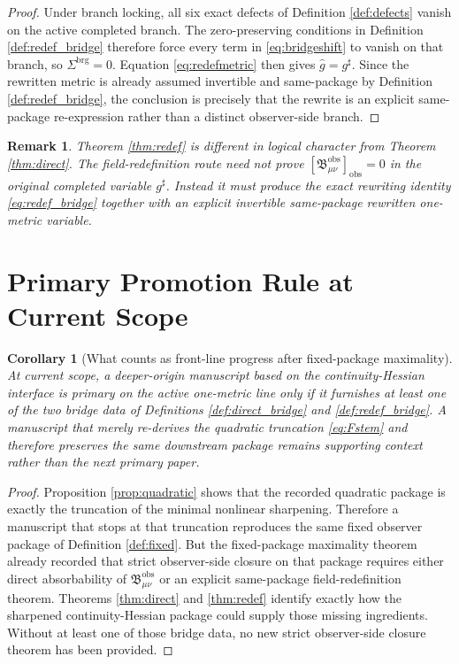 \documentclass[11pt]{article}
\newcommand{\CompletedMetric}{g^{\sharp}}
\newcommand{\RedefMetric}{\widehat g}
\newcommand{\BridgeShift}{\Sigma^{\mathrm{brg}}}
\newcommand{\ObsBurden}{\mathfrak B_{\mu\nu}^{\mathrm{obs}}}
\newcommand{\ObserverClass}[1]{\left[#1\right]_{\mathrm{obs}}}
\newtheorem{remark}{Remark}
\newtheorem{corollary}{Corollary}
\begin{document}
\begin{proof}
Under branch locking, all six exact defects of Definition \ref{def:defects} vanish on the active completed branch. The zero-preserving conditions in Definition \ref{def:redef_bridge} therefore force every term in \eqref{eq:bridgeshift} to vanish on that branch, so \(\BridgeShift=0\). Equation \eqref{eq:redefmetric} then gives \(\RedefMetric=\CompletedMetric\). Since the rewritten metric is already assumed invertible and same-package by Definition \ref{def:redef_bridge}, the conclusion is precisely that the rewrite is an explicit same-package re-expression rather than a distinct observer-side branch.
\end{proof}

\begin{remark}
Theorem \ref{thm:redef} is different in logical character from Theorem \ref{thm:direct}. The field-redefinition route need not prove \(\ObserverClass{\ObsBurden}=0\) in the original completed variable \(g^\sharp\). Instead it must produce the exact rewriting identity \eqref{eq:redef_bridge} together with an explicit invertible same-package rewritten one-metric variable.
\end{remark}

\section{Primary Promotion Rule at Current Scope}

\begin{corollary}[What counts as front-line progress after fixed-package maximality]
\label{cor:promotion}
At current scope, a deeper-origin manuscript based on the continuity-Hessian interface is primary on the active one-metric line only if it furnishes at least one of the two bridge data of Definitions \ref{def:direct_bridge} and \ref{def:redef_bridge}. A manuscript that merely re-derives the quadratic truncation \eqref{eq:Fstem} and therefore preserves the same downstream package remains supporting context rather than the next primary paper.
\end{corollary}

\begin{proof}
Proposition \ref{prop:quadratic} shows that the recorded quadratic package is exactly the truncation of the minimal nonlinear sharpening. Therefore a manuscript that stops at that truncation reproduces the same fixed observer package of Definition \ref{def:fixed}. But the fixed-package maximality theorem already recorded that strict observer-side closure on that package requires either direct absorbability of \(\ObsBurden\) or an explicit same-package field-redefinition theorem. Theorems \ref{thm:direct} and \ref{thm:redef} identify exactly how the sharpened continuity-Hessian package could supply those missing ingredients. Without at least one of those bridge data, no new strict observer-side closure theorem has been provided.
\end{proof}
\end{document}
